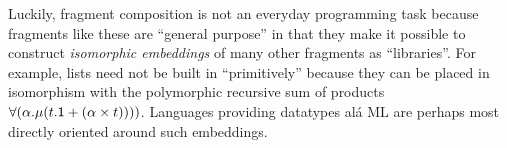 \documentclass{llncs}
\begin{document}
Luckily, fragment composition is not an everyday programming task because fragments like these are ``general purpose'' in that they make it possible to construct \emph{isomorphic embeddings} of many other fragments as ``libraries''. For example, lists need not be built in ``primitively'' because they can be placed in isomorphism with the polymorphic recursive sum of products $\forall(\alpha.\mu(t.{\sf 1} + (\alpha \times t))))$. Languages providing datatypes al\'a ML  are perhaps most directly oriented around such embeddings. %
\end{document}
